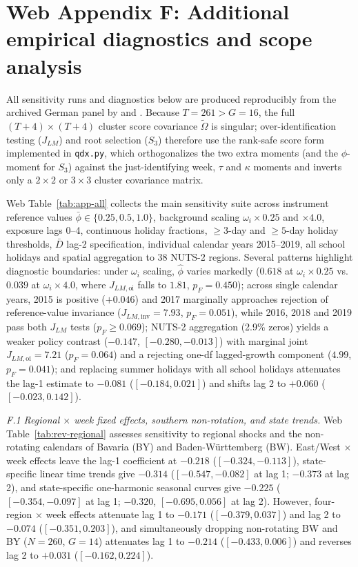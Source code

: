 \section*{Web Appendix F: Additional empirical diagnostics and scope analysis}
\label{app:diag}

All sensitivity runs and diagnostics below are produced reproducibly from the archived German panel
by  and .
Because $T=261>G=16$, the full $(T+4)\times(T+4)$ cluster score covariance $\tilde\Omega$ is
singular; over-identification testing ($J_{LM}$) and root selection ($S_3$) therefore use the
rank-safe score form implemented in \texttt{qdx.py}, which orthogonalizes the two extra moments (and
the $\phi$-moment for $S_3$) against the just-identifying week, $\tau$ and $\kappa$ moments and
inverts only a $2\times 2$ or $3\times 3$ cluster covariance matrix.

Web Table~\ref{tab:app-all} collects the main sensitivity suite across instrument reference values
$\bar\phi\in\{0.25,0.5,1.0\}$, background scaling $\omega_i\times 0.25$ and $\times 4.0$, exposure
lags 0--4, continuous holiday fractions, $\ge 3$-day and $\ge 5$-day holiday thresholds, $\bar D$
lag-2 specification, individual calendar years 2015--2019, all school holidays and spatial
aggregation to 38 NUTS-2 regions. Several patterns highlight diagnostic boundaries: under $\omega_i$
scaling, $\hat\phi$ varies markedly ($0.618$ at $\omega_i\times 0.25$ vs.\ $0.039$ at $\omega_i\times 4.0$,
where $J_{LM,\mathrm{oi}}$ falls to $1.81$, $p_F=0.450$); across single calendar years, 2015 is
positive ($+0.046$) and 2017 marginally approaches rejection of reference-value invariance
($J_{LM,\mathrm{inv}}=7.93$, $p_F=0.051$), while 2016, 2018 and 2019 pass both $J_{LM}$ tests
($p_F\ge 0.069$); NUTS-2
aggregation (2.9\% zeros) yields a weaker policy contrast ($-0.147$, $[-0.280,-0.013]$) with
marginal joint $J_{LM,\mathrm{oi}}=7.21$ ($p_F=0.064$) and a rejecting one-df lagged-growth
component ($4.99$, $p_F=0.041$); and replacing summer holidays with all school holidays attenuates
the lag-1 estimate to $-0.081$ ($[-0.184,0.021]$) and shifts lag 2 to $+0.060$ ($[-0.023,0.142]$).



\emph{F.1 Regional $\times$ week fixed effects, southern non-rotation, and state trends.} Web
Table~\ref{tab:rev-regional} assesses sensitivity to regional shocks and the non-rotating calendars
of Bavaria (BY) and Baden-W\"urttemberg (BW). East/West $\times$ week effects leave the lag-1
coefficient at $-0.218$ ($[-0.324,-0.113]$), state-specific linear time trends give $-0.314$
($[-0.547,-0.082]$ at lag 1; $-0.373$ at lag 2), and state-specific one-harmonic seasonal curves
give $-0.225$ ($[-0.354,-0.097]$ at lag 1; $-0.320$, $[-0.695,0.056]$ at lag 2). However,
four-region $\times$ week effects attenuate lag 1 to $-0.171$ ($[-0.379,0.037]$) and lag 2 to
$-0.074$ ($[-0.351,0.203]$), and simultaneously dropping non-rotating BW and BY ($N=260$, $G=14$)
attenuates lag 1 to $-0.214$ ($[-0.433,0.006]$) and reverses lag 2 to $+0.031$ ($[-0.162,0.224]$).

